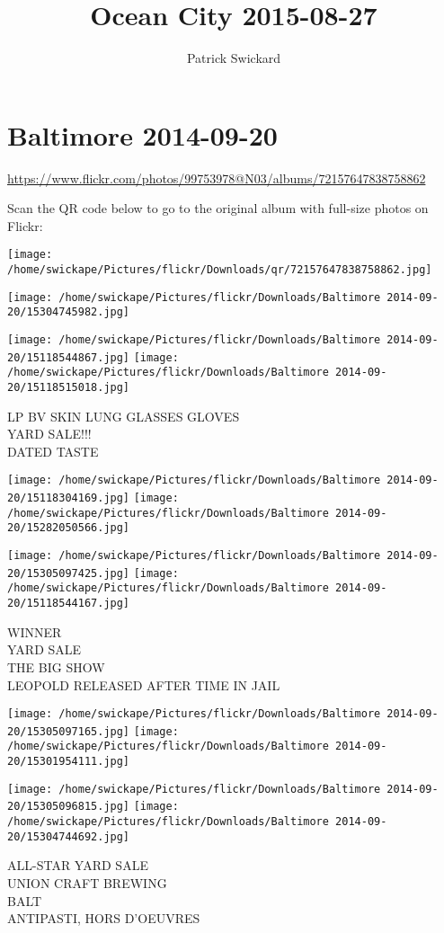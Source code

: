 \documentclass[10pt,letterpaper]{article}
\title{Ocean City 2015-08-27}
\author{Patrick Swickard}
\date{}
\begin{document}
\section*{Baltimore 2014-09-20}

\url{https://www.flickr.com/photos/99753978@N03/albums/72157647838758862}

Scan the QR code below to go to the original album with full-size photos on Flickr:

\texttt{[image: /home/swickape/Pictures/flickr/Downloads/qr/72157647838758862.jpg]}
\pagebreak

\texttt{[image: /home/swickape/Pictures/flickr/Downloads/Baltimore 2014-09-20/15304745982.jpg]}

\vspace{0.25in}
\texttt{[image: /home/swickape/Pictures/flickr/Downloads/Baltimore 2014-09-20/15118544867.jpg]}
\texttt{[image: /home/swickape/Pictures/flickr/Downloads/Baltimore 2014-09-20/15118515018.jpg]}

LP BV SKIN LUNG GLASSES GLOVES\\
YARD SALE!!!\\
DATED TASTE
\pagebreak

\texttt{[image: /home/swickape/Pictures/flickr/Downloads/Baltimore 2014-09-20/15118304169.jpg]}
\texttt{[image: /home/swickape/Pictures/flickr/Downloads/Baltimore 2014-09-20/15282050566.jpg]}

\texttt{[image: /home/swickape/Pictures/flickr/Downloads/Baltimore 2014-09-20/15305097425.jpg]}
\texttt{[image: /home/swickape/Pictures/flickr/Downloads/Baltimore 2014-09-20/15118544167.jpg]}

WINNER\\
YARD SALE\\
THE BIG SHOW\\
LEOPOLD RELEASED AFTER TIME IN JAIL
\pagebreak

\texttt{[image: /home/swickape/Pictures/flickr/Downloads/Baltimore 2014-09-20/15305097165.jpg]}
\texttt{[image: /home/swickape/Pictures/flickr/Downloads/Baltimore 2014-09-20/15301954111.jpg]}

\texttt{[image: /home/swickape/Pictures/flickr/Downloads/Baltimore 2014-09-20/15305096815.jpg]}
\texttt{[image: /home/swickape/Pictures/flickr/Downloads/Baltimore 2014-09-20/15304744692.jpg]}

ALL{-}STAR YARD SALE\\
UNION CRAFT BREWING\\
BALT\\
ANTIPASTI, HORS D'OEUVRES
\pagebreak
\end{document}
